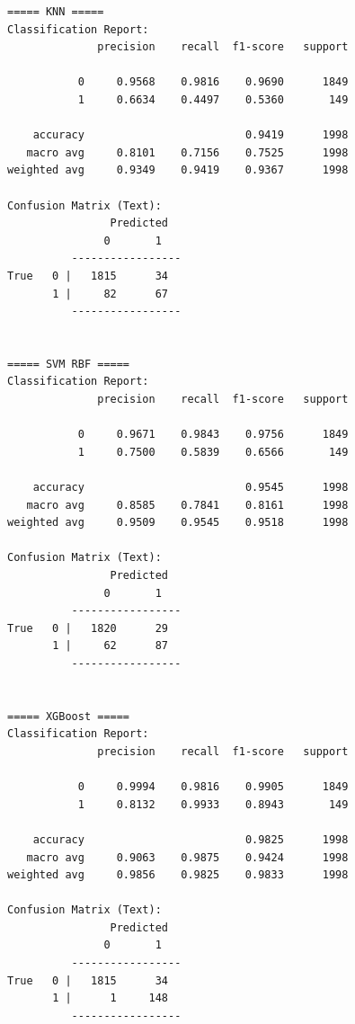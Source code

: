 \begin{lstlisting}[caption={Output 10}]
===== KNN =====
Classification Report:
              precision    recall  f1-score   support

           0     0.9568    0.9816    0.9690      1849
           1     0.6634    0.4497    0.5360       149

    accuracy                         0.9419      1998
   macro avg     0.8101    0.7156    0.7525      1998
weighted avg     0.9349    0.9419    0.9367      1998

Confusion Matrix (Text):
                Predicted
               0       1
          -----------------
True   0 |   1815      34
       1 |     82      67
          -----------------


===== SVM RBF =====
Classification Report:
              precision    recall  f1-score   support

           0     0.9671    0.9843    0.9756      1849
           1     0.7500    0.5839    0.6566       149

    accuracy                         0.9545      1998
   macro avg     0.8585    0.7841    0.8161      1998
weighted avg     0.9509    0.9545    0.9518      1998

Confusion Matrix (Text):
                Predicted
               0       1
          -----------------
True   0 |   1820      29
       1 |     62      87
          -----------------


===== XGBoost =====
Classification Report:
              precision    recall  f1-score   support

           0     0.9994    0.9816    0.9905      1849
           1     0.8132    0.9933    0.8943       149

    accuracy                         0.9825      1998
   macro avg     0.9063    0.9875    0.9424      1998
weighted avg     0.9856    0.9825    0.9833      1998

Confusion Matrix (Text):
                Predicted
               0       1
          -----------------
True   0 |   1815      34
       1 |      1     148
          -----------------
\end{lstlisting}

